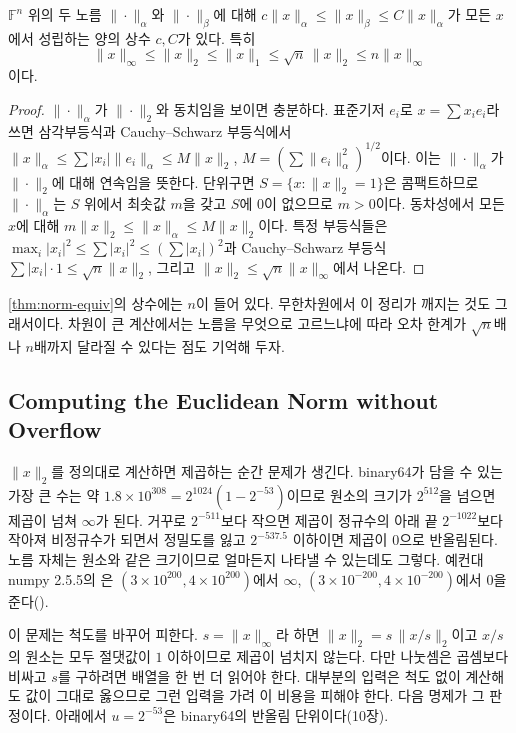 \begin{theorem}
\label{thm:norm-equiv}
$\mathbb{F}^n$ 위의 두 노름 $\|\cdot\|_\alpha$와 $\|\cdot\|_\beta$에 대해 $c\|x\|_\alpha\le\|x\|_\beta\le C\|x\|_\alpha$가 모든 $x$에서 성립하는 양의 상수 $c,C$가 있다. 특히
\[
\|x\|_\infty\le\|x\|_2\le\|x\|_1\le\sqrt n\,\|x\|_2\le n\|x\|_\infty
\]
이다.
\end{theorem}

\begin{proof}
$\|\cdot\|_\alpha$가 $\|\cdot\|_2$와 동치임을 보이면 충분하다. 표준기저 $e_i$로 $x=\sum x_ie_i$라 쓰면 삼각부등식과 Cauchy--Schwarz 부등식에서 $\|x\|_\alpha\le\sum|x_i|\|e_i\|_\alpha\le M\|x\|_2$, $M=(\sum\|e_i\|_\alpha^2)^{1/2}$이다. 이는 $\|\cdot\|_\alpha$가 $\|\cdot\|_2$에 대해 연속임을 뜻한다. 단위구면 $S=\{x:\|x\|_2=1\}$은 콤팩트하므로 $\|\cdot\|_\alpha$는 $S$ 위에서 최솟값 $m$을 갖고 $S$에 $0$이 없으므로 $m>0$이다. 동차성에서 모든 $x$에 대해 $m\|x\|_2\le\|x\|_\alpha\le M\|x\|_2$이다. 특정 부등식들은 $\max_i|x_i|^2\le\sum|x_i|^2\le(\sum|x_i|)^2$과 Cauchy--Schwarz 부등식 $\sum|x_i|\cdot1\le\sqrt n\|x\|_2$, 그리고 $\|x\|_2\le\sqrt n\|x\|_\infty$에서 나온다.
\end{proof}

\cref{thm:norm-equiv}의 상수에는 $n$이 들어 있다. 무한차원에서 이 정리가 깨지는 것도 그래서이다. 차원이 큰 계산에서는 노름을 무엇으로 고르느냐에 따라 오차 한계가 $\sqrt n$배나 $n$배까지 달라질 수 있다는 점도 기억해 두자.

\subsection{Computing the Euclidean Norm without Overflow}

$\|x\|_2$를 정의대로 계산하면 제곱하는 순간 문제가 생긴다. binary64가 담을 수 있는 가장 큰 수는 약 $1.8\times10^{308}=2^{1024}(1-2^{-53})$이므로 원소의 크기가 $2^{512}$을 넘으면 제곱이 넘쳐 $\infty$가 된다. 거꾸로 $2^{-511}$보다 작으면 제곱이 정규수의 아래 끝 $2^{-1022}$보다 작아져 비정규수가 되면서 정밀도를 잃고 $2^{-537.5}$ 이하이면 제곱이 $0$으로 반올림된다. 노름 자체는 원소와 같은 크기이므로 얼마든지 나타낼 수 있는데도 그렇다. 예컨대 numpy 2.5.5의 은 $(3\times10^{200},4\times10^{200})$에서 $\infty$, $(3\times10^{-200},4\times10^{-200})$에서 $0$을 준다().

이 문제는 척도를 바꾸어 피한다. $s=\|x\|_\infty$라 하면 $\|x\|_2=s\,\|x/s\|_2$이고 $x/s$의 원소는 모두 절댓값이 $1$ 이하이므로 제곱이 넘치지 않는다. 다만 나눗셈은 곱셈보다 비싸고 $s$를 구하려면 배열을 한 번 더 읽어야 한다. 대부분의 입력은 척도 없이 계산해도 값이 그대로 옳으므로 그런 입력을 가려 이 비용을 피해야 한다. 다음 명제가 그 판정이다. 아래에서 $u=2^{-53}$은 binary64의 반올림 단위이다(10장).

